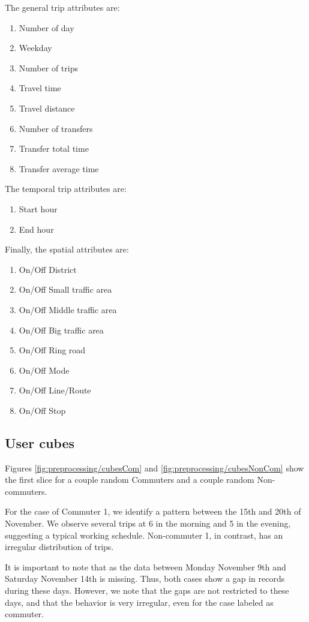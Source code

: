 \documentclass{article}
\begin{document}
The general trip attributes are: 

\begin{enumerate}
\item Number of day
\item Weekday
\item Number of trips
\item Travel time
\item Travel distance
\item Number of transfers
\item Transfer total time
\item Transfer average time
\end{enumerate}

The temporal trip attributes are:
 
\begin{enumerate}
\item Start hour
\item End hour
\end{enumerate}

Finally, the spatial attributes are:

\begin{enumerate}
\item On/Off District
\item On/Off Small traffic area
\item On/Off Middle traffic area
\item On/Off Big traffic area
\item On/Off Ring road
\item On/Off Mode
\item On/Off Line/Route
\item On/Off Stop
\end{enumerate}

\subsection{User cubes}
Figures \ref{fig:preprocessing/cubesCom} and \ref{fig:preprocessing/cubesNonCom} show the first slice for a couple random Commuters and a couple random Non-commuters.

For the case of Commuter 1, we identify a pattern between the 15th and 20th of November. We observe several trips at 6 in the morning and 5 in the evening, suggesting a typical working schedule. Non-commuter 1, in contrast, has an irregular distribution of trips. 

It is important to note that as the data between Monday November 9th and Saturday November 14th is missing. Thus, both cases show a gap in records during these days. However, we note that the gaps are not restricted to these days, and that the behavior is very irregular, even for the case labeled as commuter. 
\end{document}
